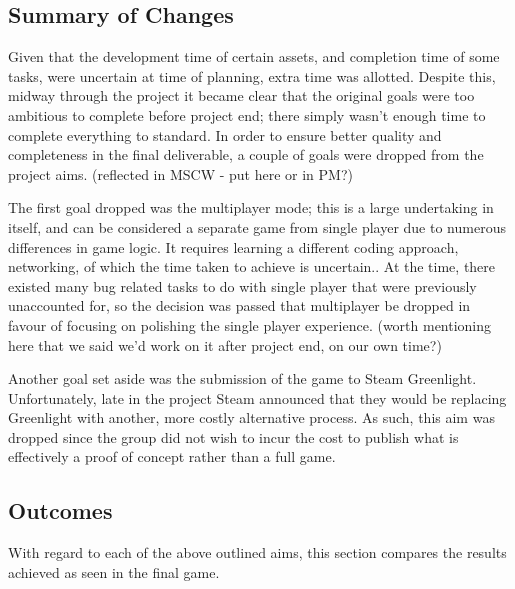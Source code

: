 \documentclass[12pt]{article}
\begin{document}
\subsection{Summary of Changes}
Given that the development time of certain assets, and completion time of some tasks, were uncertain at time of planning, extra time was allotted. Despite this, midway through the project it became clear that the original goals were too ambitious to complete before project end; there simply wasn't enough time to complete everything to standard. In order to ensure better quality and completeness in the final deliverable, a couple of goals were dropped from the project aims. (reflected in MSCW - put here or in PM?)

The first goal dropped was the multiplayer mode; this is a large undertaking in itself, and can be considered a separate game from single player due to numerous differences in game logic. It requires learning a different coding approach, networking, of which the time taken to achieve is uncertain.. At the time, there existed many bug related tasks to do with single player that were previously unaccounted for, so the decision was passed that multiplayer be dropped in favour of focusing on polishing the single player experience. (worth mentioning here that we said we'd work on it after project end, on our own time?)

Another goal set aside was the submission of the game to Steam Greenlight. Unfortunately, late in the project Steam announced that they would be replacing Greenlight with another, more costly alternative process. As such, this aim was dropped since the group did not wish to incur the cost to publish what is effectively a proof of concept rather than a full game.
 
\subsection{Outcomes}
With regard to each of the above outlined aims, this section compares the results achieved as seen in the final game. 
\end{document}
